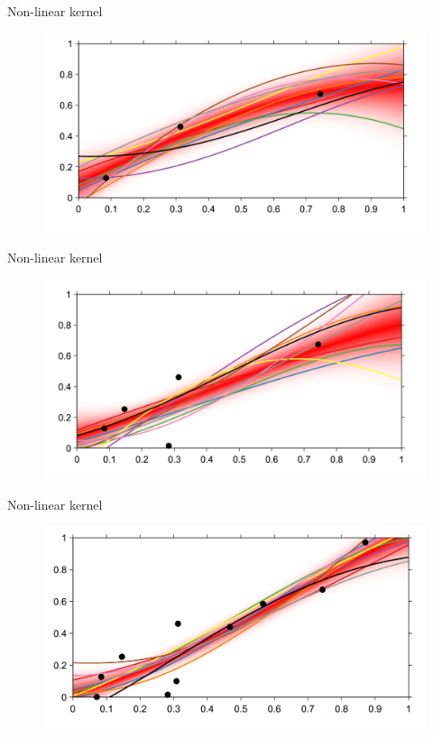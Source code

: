 \documentclass[12pt]{beamer}
\begin{document}
\begin{frame}{Non-linear kernel}
\begin{figure}
\includegraphics[scale=0.4]{Bayesian_non_linear_5.png} 
\end{figure}
\end{frame}
\begin{frame}{Non-linear kernel}
\begin{figure}
\includegraphics[scale=0.4]{Bayesian_non_linear_6.png} 
\end{figure}
\end{frame}
\begin{frame}{Non-linear kernel}
\begin{figure}
\includegraphics[scale=0.4]{Bayesian_non_linear_7.png} 
\end{figure}
\end{frame}
\end{document}
